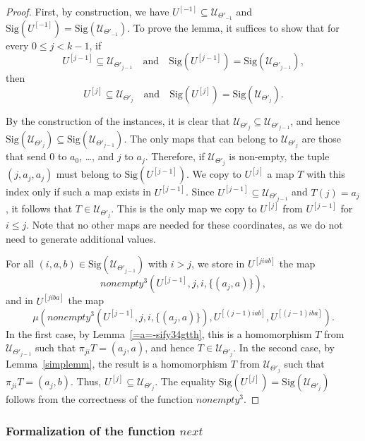 \documentclass{article}
\theoremstyle{definition}
\theoremstyle{theorem}
\theoremstyle{theorem}
\theoremstyle{remark}
\theoremstyle{remark}
\theoremstyle{example}
\theoremstyle{notation}
\theoremstyle{theorem}
\begin{document}
\begin{proof}
First, by construction, we have $U^{[-1]} \subseteq \mathscr{U}_{\Theta'_{-1}}$ and $\mathrm{Sig}(U^{[-1]}) = \mathrm{Sig}(\mathscr{U}_{\Theta'_{-1}})$. To prove the lemma, it suffices to show that for every $0 \leq j < k-1$, if 
\[
U^{[j-1]} \subseteq \mathscr{U}_{\Theta'_{j-1}} \quad \text{and} \quad \mathrm{Sig}(U^{[j-1]}) = \mathrm{Sig}(\mathscr{U}_{\Theta'_{j-1}}),
\]
then
\[
U^{[j]} \subseteq \mathscr{U}_{\Theta'_{j}} \quad \text{and} \quad \mathrm{Sig}(U^{[j]}) = \mathrm{Sig}(\mathscr{U}_{\Theta'_{j}}).
\]

By the construction of the instances, it is clear that $\mathscr{U}_{\Theta'_{j}} \subseteq \mathscr{U}_{\Theta'_{j-1}}$, and hence $\mathrm{Sig}(\mathscr{U}_{\Theta'_{j}}) \subseteq \mathrm{Sig}(\mathscr{U}_{\Theta'_{j-1}})$. The only maps that can belong to $\mathscr{U}_{\Theta'_{j}}$ are those that send $0$ to $a_0$, \ldots , and $j$ to $a_j$. Therefore, if $\mathscr{U}_{\Theta'_{j}}$ is non-empty, the tuple $(j, a_j, a_j)$ must belong to $\mathrm{Sig}(U^{[j-1]})$. We copy to $U^{[j]}$ a map $T$ with this index only if such a map exists in $U^{[j-1]}$. Since $U^{[j-1]} \subseteq \mathscr{U}_{\Theta'_{j-1}}$ and $T(j) = a_j$, it follows that $T \in \mathscr{U}_{\Theta'_{j}}$. This is the only map we copy to $U^{[j]}$ from $U^{[j-1]}$ for $i \leq j$. Note that no other maps are needed for these coordinates, as we do not need to generate additional values.

For all $(i, a, b) \in \mathrm{Sig}(\mathscr{U}_{\Theta'_{j-1}})$ with $i > j$, we store in $U^{[j i a b]}$ the map $$nonempty^3(U^{[j-1]}, j, i, \{(a_j, a)\}),$$ and in $U^{[j i b a]}$ the map 
\[
\mu(nonempty^3(U^{[j-1]}, j, i, \{(a_j, a)\}), U^{[(j-1) i a b]}, U^{[(j-1) i b a]}).
\]
In the first case, by Lemma~\ref{=a=-sify34gtth}, this is a homomorphism $T$ from $\mathscr{U}_{\Theta'_{j-1}}$ such that $\pi_{j i} T = (a_j, a)$, and hence $T \in \mathscr{U}_{\Theta'_{j}}$. In the second case, by Lemma~\ref{simplemm}, the result is a homomorphism $T$ from $\mathscr{U}_{\Theta'_{j}}$ such that $\pi_{j i} T = (a_j, b)$. Thus, $U^{[j]} \subseteq \mathscr{U}_{\Theta'_{j}}$. The equality $\mathrm{Sig}(U^{[j]}) = \mathrm{Sig}(\mathscr{U}_{\Theta'_{j}})$ follows from the correctness of the function $nonempty^3$.
\end{proof}






 \subsubsection{Formalization of the function $next$}\label{+++)_)_)KJ}
\end{document}
